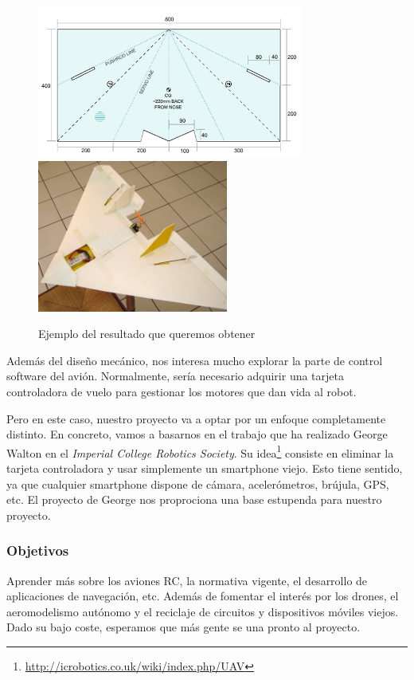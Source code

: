 \documentclass[12pt,twoside]{report}
\begin{document}
\begin{figure}[hbtp]
\centerline{\includegraphics[height=5cm]{fotosNuevas/plan_main}
\includegraphics[height=5cm]{fotosNuevas/mugi02}}
\caption*{
Ejemplo del resultado que queremos obtener
}
\end{figure}

Además del diseño mecánico, nos interesa mucho explorar la parte de control software del avión. Normalmente, sería necesario adquirir una tarjeta controladora de vuelo para gestionar los motores que dan vida al robot.

Pero en este caso, nuestro proyecto va a optar por un enfoque completamente distinto. En concreto, vamos a basarnos en el trabajo que ha realizado George Walton en el \emph{Imperial College Robotics Society}. Su idea\footnote{\url{http://icrobotics.co.uk/wiki/index.php/UAV}} consiste en eliminar la tarjeta controladora y usar simplemente un smartphone viejo. Esto tiene sentido, ya que cualquier smartphone dispone de cámara, acelerómetros, brújula, GPS, etc. El proyecto de George nos proprociona una base estupenda para nuestro proyecto.

\subsubsection{Objetivos}

Aprender más sobre los aviones RC, la normativa vigente, el desarrollo de aplicaciones de navegación, etc. Además de fomentar el interés por los drones, el aeromodelismo autónomo y el reciclaje de circuitos y dispositivos móviles viejos. Dado su bajo coste, esperamos que más gente se una pronto al proyecto.
\end{document}
